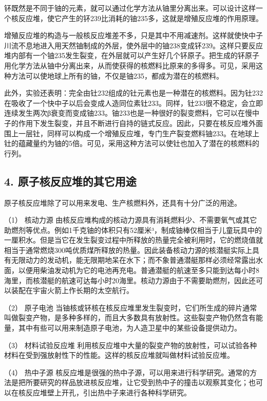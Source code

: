 钚既然是不同于铀的元素，就可以通过化学方法从铀里分离出来。可以设计这样一个核反应堆，使它产生的钚239比消耗的铀235多，这就是增殖反应堆的作用原理。

增殖反应堆的构造与一般核反应堆差不多，只是其中不用减速剂。这样就使快中子川流不息地进入用天然铀制成的外层，使外层中的铀238变成钚239。这样只要反应堆内部有一个铀235发生裂变，在外层就可以产生好几个钚原子。把生成的钚原子用化学方法从铀中分离出来，从而使获得的核燃料比原来的多得多。可见，采用这种方法可以使地球上所有的铀，不仅是铀235，都成为潜在的核燃料。

此外，实验还表明：完全由钍232组成的钍元素也是一种潜在的核燃料。因为钍232在吸收了一个快中子以后会变成人造同位素钍233。同样，钍233很不稳定，会立即连续发生两次β衰变而变成铀233。铀233也是一种很好的裂变燃料，它可以在慢中子的作用下发生裂变，并且不断进行自持的链式反应。因此，只要在核反应堆外面围上一层钍，同样可以构成一个增殖反应堆，专门生产裂变燃料铀233。在地球上钍的蕴藏量约为铀的5倍。可见，采用这种方法可以使钍也加入了潜在的核燃料的行列。

\subsection{4.
原子核反应堆的其它用途}

原子核反应堆除了可以用来发电、生产核燃料外，还具有十分广泛的用途。

（1） 核动力源
由核反应堆构成的核动力源具有消耗燃料少、不需要氧气或其它助燃剂等优点。例如1千克铀的体积只有52厘米³，制成铀棒仅相当于儿童玩具中的一厘积水。但是当它在发生裂变过程中所释放的热量完全被利用时，它的燃烧值就相当于通常燃烧300吨优质煤所释放的热量。因此装备核动力源的核潜艇实际上具有无限动力的发动机，能无限期地呆在水下；而不象普通潜艇那样必须经常露出水面，以便用柴油发动机为它的电池再充电。普通潜艇的航速至多只能到达每小时8海里，而核潜艇的航速可达每小时20海里。核动力源由于不需要助燃剂，因此还可以装配在宇宙火箭上作长期的太空航行。

（2） 原子电池
当铀核或钚核在核反应堆里发生裂变时，它们所生成的碎片通常叫做裂变产物，是多种多样的，而且大多数具有放射性。这些裂变产物仍然含有能量，其中有些可以用来制造原子电池，为人造卫星中的某些设备提供动力。

（3） 材料试验反应堆
利用核反应堆中大量的裂变产物的放射性，可以试验各种材料在受到强放射性下的性能。这样的核反应堆就叫做材料试验反应堆。

（4） 热中子源
核反应堆是很强的热中子源，可以用来进行科学研究。通常的方法是把所要研究的样品放进核反应堆，让它受到热中子的撞击以观察其变化；也可以在核反应堆壁上开孔，引出热中子来进行各种科学研究。

